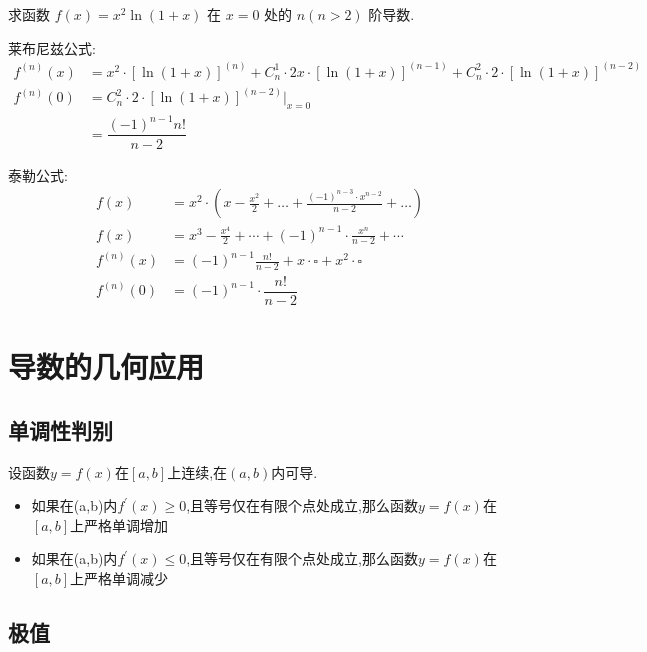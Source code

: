 \documentclass[8pt a4paper, oneside, UTF8]{ctexbook}  %
\begin{document}
\begin{sloppypar}
    \begin{problem}
        求函数 $f(x)=x^2\ln(1+x)$ 在 $x=0$ 处的 $n(n>2)$ 阶导数.      
    \end{problem}
    \begin{solution}{莱布尼兹公式:}
        \begin{align*}
            f^{(n)}(x) & = x^{2}\cdot[\ln(1+x)]^{(n)}+C_{n}^{1}\cdot2x\cdot[\ln(1+x)]^{(n-1)}+C_{n}^{2}\cdot2\cdot[\ln(1+x)]^{(n-2)} \\
            f^{(n)}(0)& =  C_{n}^{2}\cdot2\cdot[\ln(1+x)]^{(n-2)} |_{x=0} \\
                    & =  \dfrac{(-1)^{n-1}n!}{n-2}
        \end{align*}
    \end{solution}
    \begin{solution}{泰勒公式:}
        \begin{align*}
            f(x) & = x^{2}\cdot(x-\frac{x^{2}}{2}+\ldots+\frac{(-1)^{n-3}\cdot x^{n-2}}{n-2}+\ldots) \\
          f(x) & =   x^{3}-\frac{x^{4}}{2}+\cdots+(-1)^{n-1}\cdot\frac{x^{n}}{n-2}+\cdots\\
          f^{(n)}(x)& =(-1)^{n-1}\frac{n!}{n-2}+x\cdot \square+x^{2}\cdot \square \\
          f^{(n)}(0) & =(-1)^{n-1}\cdot\dfrac{n!}{n-2}
        \end{align*}    
    \end{solution}
    \section{导数的几何应用}
    \subsection{单调性判别}
    设函数$y=f(x)$在$[a,b]$上连续,在$(a,b)$内可导.
    \begin{itemize}
        \item 如果在(a,b)内$f^{\prime}(x)\geqslant0$,且等号仅在有限个点处成立,那么函数$y=f(x)$在$[a,b]$上严格单调增加
        \item 如果在(a,b)内$f^{\prime}(x)\leqslant0$,且等号仅在有限个点处成立,那么函数$y=f(x)$在$[a,b]$上严格单调减少
    \end{itemize} 
    \subsection{极值}

\end{sloppypar}
\end{document}
